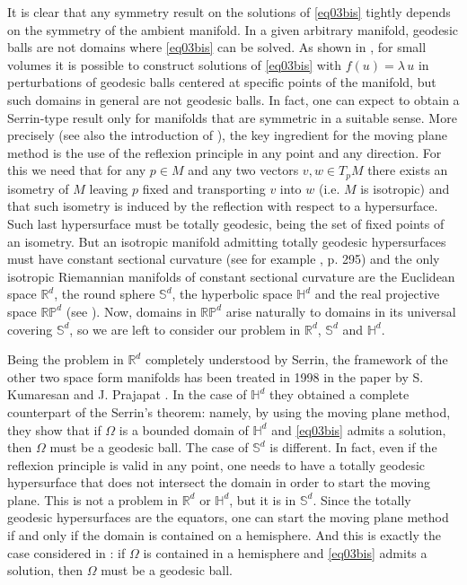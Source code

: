 \documentclass[reqno]{amsart}
\numberwithin{equation}{section}
\newenvironment{key words}{\textbf{Keywords}\mbox{  }}{ }
\begin{document}
It is clear that any symmetry result on the solutions of \eqref{eq03bis} tightly depends on the symmetry of the ambient manifold. In a given arbitrary manifold, geodesic balls are not domains where \eqref{eq03bis} can be solved. As shown in \cite{DS15}, for small volumes it is possible to construct solutions of \eqref{eq03bis} with $f(u) = \lambda\, u$ in perturbations of geodesic balls centered at specific points of the manifold, but such domains in general are not geodesic balls. In fact, one can expect to obtain a Serrin-type result only for manifolds that are symmetric in a suitable sense. More precisely (see also the introduction of \cite{DEP19}), the key ingredient for the moving plane method is the use of the reflexion principle in any point and any direction. For this we need that for any $p\in M$ and any two vectors $v,w \in T_pM$ there exists an isometry of $M$ leaving $p$ fixed and transporting $v$ into $w$ (i.e. $M$ is isotropic) and that such isometry is induced by the reflection with respect to a hypersurface. Such last hypersurface must be totally geodesic, being the set of fixed points of an isometry. But an isotropic manifold admitting totally geodesic hypersurfaces must have constant sectional curvature (see for example \cite{BCO03}, p. 295) and the only isotropic Riemannian manifolds of constant sectional curvature are the Euclidean space $\mathbb{R}^d$, the round sphere $\mathbb{S}^d$, the hyperbolic space $\mathbb{H}^d$ and the real projective space $\mathbb{RP}^d$ (see \cite{S91}). Now, domains in $\mathbb{RP}^d$ arise naturally to domains in its universal covering $\mathbb{S}^d$, so we are left to consider our problem in $\mathbb{R}^d$, $\mathbb{S}^d$ and $\mathbb{H}^d$.

\medskip

Being the problem in $\mathbb{R}^d$ completely understood by Serrin, the framework of the other two space form manifolds has been treated in 1998 in the paper by S. Kumaresan and J. Prajapat \cite{KP98}. In the case of $\mathbb{H}^d$ they obtained a complete counterpart of the Serrin's theorem: namely, by using the moving plane method, they show that if  $\Omega$ is a bounded domain of $\mathbb{H}^d$ and \eqref{eq03bis} admits a solution, then $\Omega$ must be a geodesic ball. The case of $\mathbb{S}^d$ is different. In fact, even if the reflexion principle is valid in any point, one needs to have a totally geodesic hypersurface that does not intersect the domain in order to start the moving plane. This is not a problem in $\mathbb{R}^d$ or $\mathbb{H}^d$, but it is in $\mathbb{S}^d$. Since the totally geodesic hypersurfaces are the equators, one can start the moving plane method if and only if the domain is contained on a hemisphere. And this is exactly the case considered in \cite{KP98}: if $\Omega$ is contained in a hemisphere and  \eqref{eq03bis} admits a solution, then $\Omega$ must be a geodesic ball.
\end{document}
